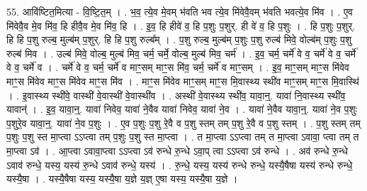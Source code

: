\documentclass[17pt]{extarticle}
\begin{document}
55. आवि॑ष्टित॒मित्या - वि॒ष्टि॒त॒म् । . भ॒व॒ त्ये॒व मे॒वम् भ॑वति भव त्ये॒व मि॑वेवै॒वम् भ॑वति भवत्ये॒व मि॑व । . ए॒व मि॑वेवै॒व मे॒व मि॑व॒ हि हीवै॒व मे॒व मि॑व॒ हि । . इ॒व॒ हि हीवे॑ व॒ हि प॒शुः प॒शुर्. ही वे॑ व॒ हि प॒शुः । . हि प॒शुः प॒शुर्. हि हि प॒शु रुल्ब॒ मुल्ब॑म् प॒शुर्. हि हि प॒शु रुल्ब᳚म् । . प॒शु रुल्ब॒ मुल्ब॑म् प॒शुः प॒शु रुल्ब॑ मिवे॒ वोल्ब॑म् प॒शुः प॒शु रुल्ब॑ मिव । . उल्ब॑ मिवे॒ वोल्ब॒ मुल्ब॑ मिव॒ चर्म॒ चर्मे॒ वोल्ब॒ मुल्ब॑ मिव॒ चर्म॑ । . इ॒व॒ चर्म॒ चर्मे॑ वे व॒ चर्मे॑ वे व॒ चर्मे॑ वे व॒ चर्मे॑ व । . चर्मे॑ वे व॒ चर्म॒ चर्मे॑ व माꣳ॒॒सम् माꣳ॒॒स मि॑व॒ चर्म॒ चर्मे॑ व माꣳ॒॒सम् । . इ॒व॒ माꣳ॒॒सम् माꣳ॒॒स मि॑वेव माꣳ॒॒स मि॑वेव माꣳ॒॒स मि॑वेव माꣳ॒॒स मि॑व । . माꣳ॒॒स मि॑वेव माꣳ॒॒सम् माꣳ॒॒स मि॒वास्थ्य स्थी॑व माꣳ॒॒सम् माꣳ॒॒स मि॒वास्थि॑ । . इ॒वास्थ्य स्थी॑वे॒ वास्थी॑ वे॒वास्थी॑ वे॒वास्थी॑व । . अस्थी॑ वे॒वास्थ्य स्थी॑व॒ यावा॒न्॒. यावा॑ नि॒वास्थ्य स्थी॑व॒ यावान्॑ । . इ॒व॒ यावा॒न्॒. यावा॑ निवेव॒ यावा॑ ने॒वैव यावा॑ निवेव॒ यावा॑ ने॒व । . यावा॑ ने॒वैव यावा॒न्॒. यावा॑ ने॒व प॒शुः प॒शुरे॒व यावा॒न्॒. यावा॑ ने॒व प॒शुः । . ए॒व प॒शुः प॒शु रे॒वै व प॒शु स्तम् तम् प॒शु रे॒वै व प॒शु स्तम् । . प॒शु स्तम् तम् प॒शुः प॒शु स्त मा॒प्त्वा ऽऽप्त्वा तम् प॒शुः प॒शु स्त मा॒प्त्वा । . त मा॒प्त्वा ऽऽप्त्वा तम् त मा॒प्त्वा ऽवावा॒ प्त्वा तम् त मा॒प्त्वा ऽव॑ । . आ॒प्त्वा ऽवावा॒प्त्वा ऽऽप्त्वा ऽव॑ रुन्धे रु॒न्धे ऽवा॒प् त्वा ऽऽप्त्वा ऽव॑ रुन्धे । . अव॑ रुन्धे रु॒न्धे ऽवाव॑ रुन्धे॒ यस्य॒ यस्य॑ रु॒न्धे ऽवाव॑ रुन्धे॒ यस्य॑ । . रु॒न्धे॒ यस्य॒ यस्य॑ रुन्धे रुन्धे॒ यस्यै॒षैषा यस्य॑ रुन्धे रुन्धे॒ यस्यै॒षा । . यस्यै॒षैषा यस्य॒ यस्यै॒षा य॒ज्ञे य॒ज्ञ् ए॒षा यस्य॒ यस्यै॒षा य॒ज्ञे । \newline
\end{document}
